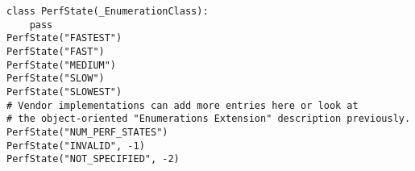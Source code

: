 \begin{center}\begin{minipage}{.95\linewidth}\begin{lstlisting}
class PerfState(_EnumerationClass):
    pass
PerfState("FASTEST")
PerfState("FAST")
PerfState("MEDIUM")
PerfState("SLOW")
PerfState("SLOWEST")
# Vendor implementations can add more entries here or look at  
# the object-oriented "Enumerations Extension" description previously. 
PerfState("NUM_PERF_STATES")
PerfState("INVALID", -1)
PerfState("NOT_SPECIFIED", -2)
\end{lstlisting}\end{minipage}\end{center}


